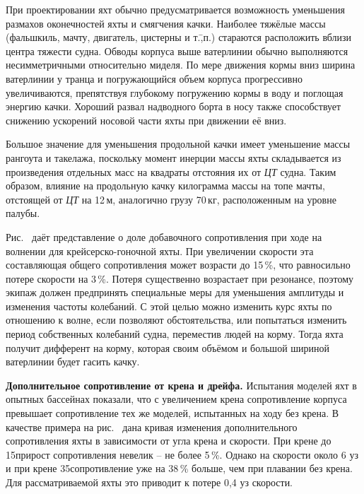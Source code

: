 При проектировании яхт обычно предусматривается возможность уменьшения
размахов оконечностей яхты и смягчения качки. Наиболее тяжёлые массы
(фальшкиль, мачту, двигатель, цистерны и т.\=,п.) стараются
расположить вблизи центра тяжести судна. Обводы корпуса выше
ватерлинии обычно выполняются несимметричными относительно миделя. По
мере движения кормы вниз ширина ватерлинии у транца и погружающийся
объем корпуса прогрессивно увеличиваются, препятствуя глубокому
погружению кормы в воду и поглощая энергию качки. Хороший развал
надводного борта в носу также способствует снижению ускорений носовой
части яхты при движении её вниз.
 
Большое значение для уменьшения продольной качки имеет уменьшение
массы рангоута и такелажа, поскольку момент инерции массы яхты
складывается из произведения отдельных масс на квадраты отстояния их
от \textit{ЦТ} судна. Таким образом, влияние на продольную качку
килограмма массы на топе мачты, отстоящей от \textit{ЦТ} на 12\,м,
аналогично грузу 70\,кг, расположенным на уровне палубы.

Рис.~ даёт представление о доле добавочного сопротивления при
ходе на волнении для крейсерско-гоночной яхты. При увеличении скорости
эта составляющая общего сопротивления может возрасти до 15\,\%, что равносильно потере скорости на 3\,\%. Потеря
существенно возрастает при резонансе, поэтому экипаж должен
предпринять специальные меры для уменьшения амплитуды и изменения
частоты колебаний. С этой целью можно изменить курс яхты по отношению
к волне, если позволяют обстоятельства, или попытаться изменить период
собственных колебаний судна, переместив людей на корму. Тогда яхта
получит дифферент на корму, которая своим объёмом и большой шириной
ватерлинии будет гасить качку.

\textbf{Дополнительное сопротивление от крена и дрейфа.}
Испытания моделей яхт в опытных бассейнах показали, что с увеличением крена
сопротивление корпуса превышает сопротивление тех же моделей,
испытанных на ходу без крена. В качестве примера на рис.~ дана
кривая изменения дополнительного сопротивления яхты в зависимости от
угла крена и скорости. При крене до 15\gr прирост сопротивления
невелик \--- не более 5\,\%. Однако на скорости около 6 уз и при крене
35\gr сопротивление уже на 38\,\% больше, чем при плавании без
крена. Для рассматриваемой яхты это приводит к потере 0,4 уз скорости.

